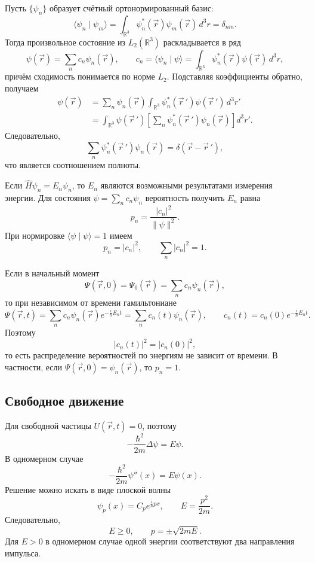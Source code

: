 \documentclass[12pt,a4paper]{article}
\begin{document}
Пусть $\{\psi_n\}$ образует счётный ортонормированный базис:
\[
    \langle\psi_n\mid\psi_m\rangle
    =\int_{\mathbb R^3}\psi_n^*(\vec r)\psi_m(\vec r)\,d^3r
    =\delta_{nm}.
\]
Тогда произвольное состояние из $L_2(\mathbb R^3)$ раскладывается в ряд
\[
    \psi(\vec r)=\sum_n c_n\psi_n(\vec r),
    \qquad
    c_n=\langle\psi_n\mid\psi\rangle
    =\int_{\mathbb R^3}\psi_n^*(\vec r)\psi(\vec r)\,d^3r,
\]
причём сходимость понимается по норме $L_2$. Подставляя коэффициенты обратно,
получаем
\begin{align*}
    \psi(\vec r)
    &=\sum_n\psi_n(\vec r)
      \int_{\mathbb R^3}\psi_n^*(\vec r\,')\psi(\vec r\,')\,d^3r' \\
    &=\int_{\mathbb R^3}\psi(\vec r\,')
      \left[\sum_n\psi_n^*(\vec r\,')\psi_n(\vec r)\right]d^3r'.
\end{align*}
Следовательно,
\[
    \boxed{\sum_n\psi_n^*(\vec r\,')\psi_n(\vec r)
    =\delta(\vec r-\vec r\,')},
\]
что является соотношением полноты.

Если $\hat H\psi_n=E_n\psi_n$, то $E_n$ являются возможными результатами
измерения энергии. Для состояния $\psi=\sum_n c_n\psi_n$ вероятность
получить $E_n$ равна
\[
    p_n=\frac{|c_n|^2}{\|\psi\|^2}.
\]
При нормировке $\langle\psi\mid\psi\rangle=1$ имеем
\[
    p_n=|c_n|^2,
    \qquad
    \sum_n|c_n|^2=1.
\]

Если в начальный момент
\[
    \Psi(\vec r,0)=\Psi_0(\vec r)=\sum_n c_n\psi_n(\vec r),
\]
то при независимом от времени гамильтониане
\[
    \Psi(\vec r,t)
    =\sum_n c_n\psi_n(\vec r)e^{-\frac{i}{\hbar}E_nt}
    =\sum_n c_n(t)\psi_n(\vec r),
    \qquad
    c_n(t)=c_n(0)e^{-\frac{i}{\hbar}E_nt}.
\]
Поэтому
\[
    |c_n(t)|^2=|c_n(0)|^2,
\]
то есть распределение вероятностей по энергиям не зависит от времени.
В частности, если $\Psi(\vec r,0)=\psi_n(\vec r)$, то $p_n=1$.

\subsection{Свободное движение}

Для свободной частицы $U(\vec r,t)=0$, поэтому
\[
    -\frac{\hbar^2}{2m}\Delta\psi=E\psi.
\]
В одномерном случае
\[
    -\frac{\hbar^2}{2m}\psi''(x)=E\psi(x).
\]
Решение можно искать в виде плоской волны
\[
    \psi_p(x)=C_p e^{\frac{i}{\hbar}px},
    \qquad
    E=\frac{p^2}{2m}.
\]
Следовательно,
\[
    E\geq0,
    \qquad
    p=\pm\sqrt{2mE}.
\]
Для $E>0$ в одномерном случае одной энергии соответствуют два направления
импульса.
\end{document}
